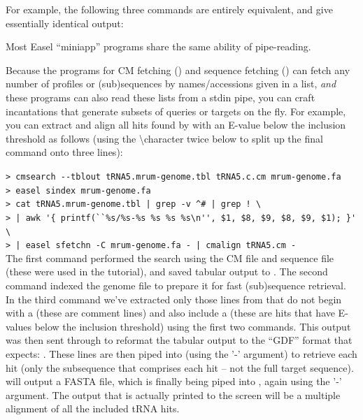For example, the following three commands are entirely equivalent, and
give essentially identical output:




Most Easel ``miniapp'' programs share the same ability of pipe-reading.

Because the programs for CM fetching () and
sequence fetching () can fetch any number of profiles
or (sub)sequences by names/accessions given in a list, \emph{and} these
programs can also read these lists from a stdin pipe, you can craft
incantations that generate subsets of queries or targets on the
fly. For example, you can extract and align all hits found by
 with an E-value below the inclusion threshold as 
follows (using the \textbackslash character twice below to split up the final
command onto three lines):

\indent\indent\small\verb+> cmsearch --tblout tRNA5.mrum-genome.tbl tRNA5.c.cm mrum-genome.fa+ \\
\indent\indent\small\verb+> easel sindex mrum-genome.fa+ \\
\indent\indent\small\verb+> cat tRNA5.mrum-genome.tbl | grep -v ^# | grep ! \ + \\
\indent\indent\small\verb+> | awk '{ printf(``%s/%s-%s %s %s %s\n'', $1, $8, $9, $8, $9, $1); }' \ + \\
\indent\indent\small\verb+> | easel sfetchn -C mrum-genome.fa - | cmalign tRNA5.cm - + \\

The first command performed the search using the CM file
 and sequence file  (these
were used in the tutorial), and saved tabular output to
.  The second command indexed the genome
file to prepare it for fast (sub)sequence retrieval. In the third
command we've extracted only those lines from
 that do not begin with a \prog{\#} (these
are comment lines) and also include a \prog{!} (these are hits that
have E-values below the inclusion threshold) using the first two
 commands. This output was then sent through  to
reformat the tabular output to the ``GDF'' format that
 expects: .  These lines are then piped into  (using
the '-' argument) to retrieve each hit (only the subsequence that
comprises each hit -- not the full target sequence). 
will output a FASTA file, which is finally being piped into
, again using the '-' argument. The output that is
actually printed to the screen will be a multiple alignment of all the
included tRNA hits.

